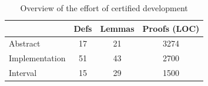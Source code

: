 \begin{table}[h]
  \centering
  \small
  \begin{tabular}{lccc}
      \toprule
      & \textbf{Defs} & \textbf{Lemmas} & \textbf{Proofs (LOC)} \\
      \midrule
      Abstract & 17 & 21 & 3274 \\
      Implementation & 51 & 43 & 2700 \\
      Interval & 15 & 29 & 1500 \\
      \bottomrule
  \end{tabular}
  \caption{Overview of the effort of certified development}
  \label{tab:abstract_impl}
\end{table}